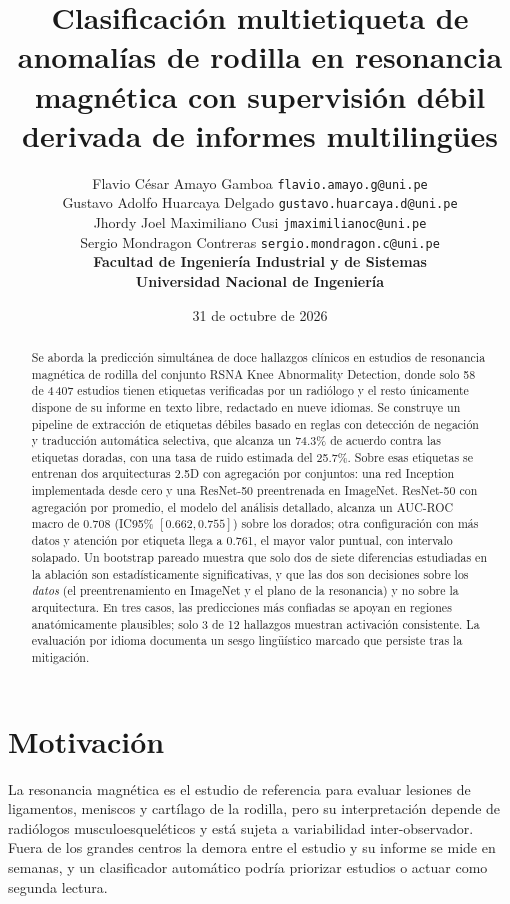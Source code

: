 \documentclass{article}
\title{Clasificación multietiqueta de anomalías de rodilla en resonancia
       magnética con supervisión débil derivada de informes multilingües}
\author{%
  Flavio César Amayo Gamboa \quad \texttt{flavio.amayo.g@uni.pe} \\
  Gustavo Adolfo Huarcaya Delgado \quad \texttt{gustavo.huarcaya.d@uni.pe} \\
  Jhordy Joel Maximiliano Cusi \quad \texttt{jmaximilianoc@uni.pe} \\
  Sergio Mondragon Contreras \quad \texttt{sergio.mondragon.c@uni.pe} \\[0.6em]
  \textbf{Facultad de Ingeniería Industrial y de Sistemas} \\
  \textbf{Universidad Nacional de Ingeniería}
}
\date{31 de octubre de 2026}
\begin{document}
\maketitle

\begin{abstract}
Se aborda la predicción simultánea de doce hallazgos clínicos en estudios de
resonancia magnética de rodilla del conjunto RSNA Knee Abnormality Detection,
donde solo 58 de 4\,407 estudios tienen etiquetas verificadas por un radiólogo y
el resto únicamente dispone de su informe en texto libre, redactado en nueve
idiomas. Se construye un pipeline de extracción de etiquetas débiles basado en
reglas con detección de negación y traducción automática selectiva, que alcanza
un 74.3\% de acuerdo contra las etiquetas doradas, con una tasa de ruido estimada
del 25.7\%. Sobre esas etiquetas se entrenan dos arquitecturas 2.5D con
agregación por conjuntos: una red Inception implementada desde cero y una
ResNet-50 preentrenada en ImageNet. ResNet-50 con agregación por promedio, el
modelo del análisis detallado, alcanza un AUC-ROC macro de 0.708 (IC95\%
$[0.662, 0.755]$) sobre los dorados; otra configuración con más datos y atención
por etiqueta llega a 0.761, el mayor valor puntual, con intervalo solapado. Un bootstrap
pareado muestra que solo dos de siete diferencias estudiadas en la ablación son
estadísticamente significativas, y que las dos son decisiones sobre los
\emph{datos} (el preentrenamiento en ImageNet y el plano de la resonancia) y no
sobre la arquitectura. En tres casos, las predicciones más confiadas se apoyan en
regiones anatómicamente plausibles; solo 3 de 12 hallazgos muestran activación
consistente. La evaluación por idioma documenta un sesgo lingüístico marcado que
persiste tras la mitigación.
\end{abstract}

\section{Motivación}

La resonancia magnética es el estudio de referencia para evaluar lesiones de
ligamentos, meniscos y cartílago de la rodilla, pero su interpretación depende de
radiólogos musculoesqueléticos y está sujeta a variabilidad inter-observador.
Fuera de los grandes centros la demora entre el estudio y su informe se mide en
semanas, y un clasificador automático podría priorizar estudios o actuar como
segunda lectura.
\end{document}
